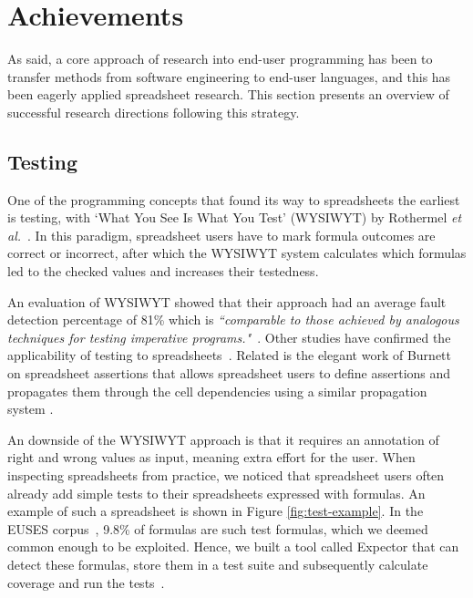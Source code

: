 \documentclass[conference]{IEEEtran}
\begin{document}
\section{Achievements}
As said, a core approach of research into end-user programming has been to transfer methods from software engineering to end-user languages, and this has been eagerly applied spreadsheet research. This section presents an overview of successful research directions following this strategy.

\subsection{Testing}
One of the programming concepts that found its way to spreadsheets the earliest is testing, with `What You See Is What You Test' (WYSIWYT) by Rothermel \emph{et al.}~\cite{Rothermel1997}. In this paradigm, spreadsheet users have to mark formula outcomes are correct or incorrect, after which the WYSIWYT system calculates which formulas led to the checked values and increases their testedness. 

An evaluation of WYSIWYT showed that their approach had an average fault detection percentage of 81\% which is \emph{``comparable to those achieved by analogous techniques for testing imperative programs."}~\cite{Rothermel2000}. Other studies have confirmed the applicability of testing to spreadsheets~\cite{Kruck2006}. Related is the elegant work of Burnett on spreadsheet assertions that allows spreadsheet users to define assertions and propagates them through the cell dependencies using a similar propagation system \cite{Burnett2003}.

An downside of the WYSIWYT approach is that it requires an annotation of right and wrong values as input, meaning extra effort for the user. When inspecting spreadsheets from practice, we noticed that spreadsheet users often already add simple tests to their spreadsheets expressed with formulas. An example of such a spreadsheet is shown in Figure \ref{fig:test-example}. In the EUSES corpus~\cite{fisher_euses_2005}, 9.8\% of formulas are such test formulas, which we deemed common enough to be exploited. Hence, we built a tool called Expector that can detect these formulas, store them in a test suite and subsequently calculate coverage and run the tests~\cite{Hermans2013-Cascon}.
\end{document}
